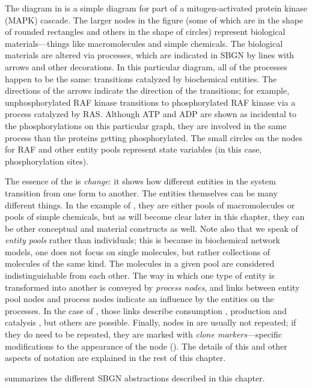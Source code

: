 The diagram in  is a simple diagram for part of a mitogen-activated protein kinase (MAPK) cascade.  The larger nodes in the figure (some of which are in the shape of rounded rectangles and others in the shape of circles) represent biological materials---things like macromolecules and simple chemicals.  The biological materials are altered via processes, which are indicated in SBGN by lines with arrows and other decorations.  In this particular diagram, all of the processes happen to be the same: transitions catalyzed by biochemical entities.  The directions of the arrows indicate the direction of the transitions; for example, unphosphorylated RAF kinase transitions to phosphorylated RAF kinase via a process catalyzed by RAS. Although ATP and ADP are shown as incidental to the phosphorylations on this particular graph, they are involved in the same process than the proteins getting phosphorylated. The small circles on the nodes for RAF and other entity pools represent state variables (in this case, phosphorylation sites). 

The essence of the \PD is \emph{change}: it shows how different entities in the system transition from one form to another.  The entities themselves can be many different things.  In the example of , they are either pools of macromolecules or pools of simple chemicals, but as will become clear later in this chapter, they can be other conceptual and material constructs as well.  Note also that we speak of \emph{entity pools} rather than individuals; this is because in biochemical network models, one does not focus on single molecules, but rather collections of molecules of the same kind.  The molecules in a given pool are considered indistinguishable from each other.  The way in which one type of entity is transformed into another is conveyed by \emph{process nodes}, and links between entity pool nodes and process nodes indicate an influence by the entities on the processes.  In the case of , those links describe consumption , production  and catalysis , but others are possible.  Finally, nodes in \PDs are usually not repeated; if they do need to be repeated, they are marked with \emph{clone markers}---specific modifications to the appearance of the node (). The details of this and other aspects of \PD notation are explained in the rest of this chapter.

 summarizes the different SBGN abstractions described in this chapter.

